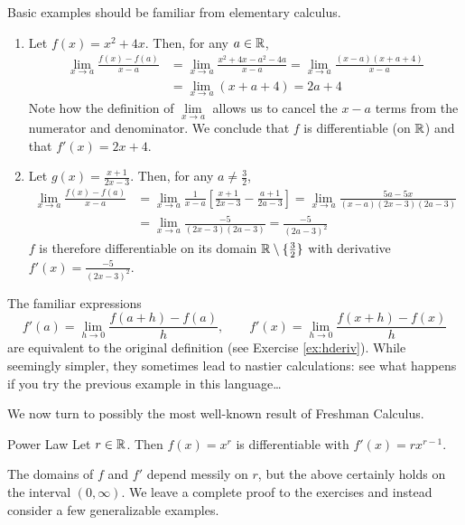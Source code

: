 \begin{examples}{}{}
	Basic examples should be familiar from elementary calculus.
	\begin{enumerate}
	  \item Let $f(x)=x^2+4x$. Then, for any $a\in\mathbb{R}$,
		\begin{align*}
			\lim_{x\to a}\frac{f(x)-f(a)}{x-a}
			&=\lim_{x\to a}\frac{x^2+4x-a^2-4a}{x-a} 
			=\lim_{x\to a}\frac{(x-a)(x+a+4)}{x-a}\\
			&=\lim_{x\to a}(x+a+4)=2a+4
		\end{align*}
		Note how the definition of $\lim\limits_{x\to a}$ allows us to cancel the $x-a$ terms from the numerator and denominator. We conclude that $f$ is differentiable (on $\mathbb{R}$) and that $f'(x)=2x+4$.
		
		\item Let $g(x)=\frac{x+1}{2x-3}$. Then, for any $a\neq\frac 32$,
		\begin{align*}
			\lim_{x\to a}\frac{f(x)-f(a)}{x-a}
			&=\lim_{x\to a}\frac 1{x-a}\left[\frac{x+1}{2x-3}-\frac{a+1}{2a-3}\right] 
			=\lim_{x\to a}\frac{5a-5x}{(x-a)(2x-3)(2a-3)}\\
			&=\lim_{x\to a}\frac{-5}{(2x-3)(2a-3)} 
			=\frac{-5}{(2a-3)^2}
		\end{align*}
		$f$ is therefore differentiable on its domain $\mathbb{R}\setminus\{\frac 32\}$ with derivative $f'(x)=\frac{-5}{(2x-3)^2}$.
	\end{enumerate}
\end{examples}

The familiar expressions
\[
	f'(a)=\lim_{h\to 0}\frac{f(a+h)-f(a)}h,\qquad 
	f'(x)=\lim_{h\to 0}\frac{f(x+h)-f(x)}h
\]
are equivalent to the original definition (see Exercise \ref{ex:hderiv}). While seemingly simpler, they sometimes lead to nastier calculations: see what happens if you try the previous example in this language\ldots\medbreak\goodbreak

We now turn to possibly the most well-known result of Freshman Calculus.

\begin{thm}{Power Law}{}
	Let $r\in\mathbb{R}$. Then $f(x)=x^r$ is differentiable with $f'(x)=rx^{r-1}$.
\end{thm}

The domains of $f$ and $f'$ depend messily on $r$, but the above certainly holds on the interval $(0,\infty)$. We leave a complete proof to the exercises and instead consider a few generalizable examples.


